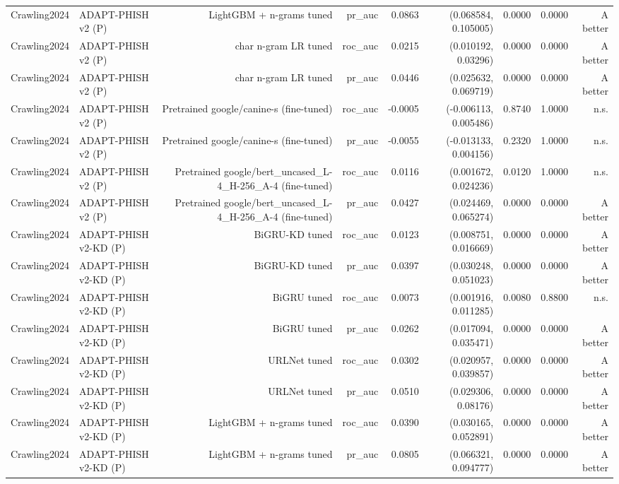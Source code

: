 \begin{table}[t]
\begin{tabular}{llrrrrrrr}
Crawling2024 & ADAPT-PHISH v2 (P) & LightGBM + n-grams tuned & pr\_auc & 0.0863 & (0.068584, 0.105005) & 0.0000 & 0.0000 & A better \\
Crawling2024 & ADAPT-PHISH v2 (P) & char n-gram LR tuned & roc\_auc & 0.0215 & (0.010192, 0.03296) & 0.0000 & 0.0000 & A better \\
Crawling2024 & ADAPT-PHISH v2 (P) & char n-gram LR tuned & pr\_auc & 0.0446 & (0.025632, 0.069719) & 0.0000 & 0.0000 & A better \\
Crawling2024 & ADAPT-PHISH v2 (P) & Pretrained google/canine-s (fine-tuned) & roc\_auc & -0.0005 & (-0.006113, 0.005486) & 0.8740 & 1.0000 & n.s. \\
Crawling2024 & ADAPT-PHISH v2 (P) & Pretrained google/canine-s (fine-tuned) & pr\_auc & -0.0055 & (-0.013133, 0.004156) & 0.2320 & 1.0000 & n.s. \\
Crawling2024 & ADAPT-PHISH v2 (P) & Pretrained google/bert\_uncased\_L-4\_H-256\_A-4 (fine-tuned) & roc\_auc & 0.0116 & (0.001672, 0.024236) & 0.0120 & 1.0000 & n.s. \\
Crawling2024 & ADAPT-PHISH v2 (P) & Pretrained google/bert\_uncased\_L-4\_H-256\_A-4 (fine-tuned) & pr\_auc & 0.0427 & (0.024469, 0.065274) & 0.0000 & 0.0000 & A better \\
Crawling2024 & ADAPT-PHISH v2-KD (P) & BiGRU-KD tuned & roc\_auc & 0.0123 & (0.008751, 0.016669) & 0.0000 & 0.0000 & A better \\
Crawling2024 & ADAPT-PHISH v2-KD (P) & BiGRU-KD tuned & pr\_auc & 0.0397 & (0.030248, 0.051023) & 0.0000 & 0.0000 & A better \\
Crawling2024 & ADAPT-PHISH v2-KD (P) & BiGRU tuned & roc\_auc & 0.0073 & (0.001916, 0.011285) & 0.0080 & 0.8800 & n.s. \\
Crawling2024 & ADAPT-PHISH v2-KD (P) & BiGRU tuned & pr\_auc & 0.0262 & (0.017094, 0.035471) & 0.0000 & 0.0000 & A better \\
Crawling2024 & ADAPT-PHISH v2-KD (P) & URLNet tuned & roc\_auc & 0.0302 & (0.020957, 0.039857) & 0.0000 & 0.0000 & A better \\
Crawling2024 & ADAPT-PHISH v2-KD (P) & URLNet tuned & pr\_auc & 0.0510 & (0.029306, 0.08176) & 0.0000 & 0.0000 & A better \\
Crawling2024 & ADAPT-PHISH v2-KD (P) & LightGBM + n-grams tuned & roc\_auc & 0.0390 & (0.030165, 0.052891) & 0.0000 & 0.0000 & A better \\
Crawling2024 & ADAPT-PHISH v2-KD (P) & LightGBM + n-grams tuned & pr\_auc & 0.0805 & (0.066321, 0.094777) & 0.0000 & 0.0000 & A better \\

\end{tabular}
\end{table}
